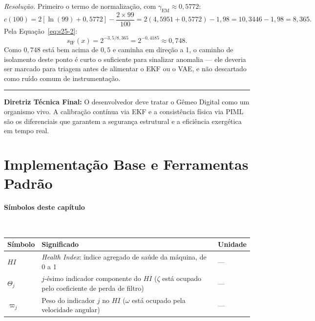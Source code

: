 \documentclass[12pt,a4paper]{article}
\numberwithin{equation}{section}
\numberwithin{table}{section}
\numberwithin{figure}{section}
\begin{document}
{	\emph{Resolução.} Primeiro o termo de normalização, com
	$\gamma_{\text{EM}} \approx 0{,}5772$:
	$$c(100) = 2\left[\ln(99) + 0{,}5772\right] - \frac{2 \times 99}{100}
	= 2(4{,}5951+0{,}5772) - 1{,}98 = 10{,}3446 - 1{,}98 = 8{,}365.$$
	Pela Equação~\eqref{eq:s25-2}:
	$$s_{\text{IF}}(x) = 2^{-3{,}5/8{,}365} = 2^{-0{,}4185} \approx
	0{,}748.$$
	Como $0{,}748$ está bem acima de $0{,}5$ e caminha em direção a 1,
	o caminho de isolamento deste ponto é curto o suficiente para
	sinalizar anomalia --- ele deveria ser marcado para triagem antes de
	alimentar o EKF ou o VAE, e não descartado como ruído comum de
	instrumentação.

	\vspace{1em}
	\hrule
	\vspace{1em}

	\textbf{Diretriz Técnica Final:} O desenvolvedor deve tratar o Gêmeo Digital como um organismo vivo. A calibração contínua via EKF e a consistência física via PIML são os diferenciais que garantem a segurança estrutural e a eficiência exergética em tempo real.
	
	\newpage

	\clearpage
	\section{Implementação Base e Ferramentas Padrão}

\paragraph{Símbolos deste capítulo}\mbox{}\\[-0.5em]
{\small
\begin{longtable}{>{\raggedright\arraybackslash}p{2.6cm} >{\raggedright\arraybackslash}p{9.2cm} >{\raggedright\arraybackslash}p{2.6cm}}
	\toprule
	\textbf{Símbolo} & \textbf{Significado} & \textbf{Unidade} \\ \midrule
	\endhead
	$HI$ & \textit{Health Index}: índice agregado de saúde da máquina, de 0 a 1 & --- \\
	$\Theta_j$\dag & $j$-ésimo indicador componente do $HI$ ($\zeta$ está ocupado pelo coeficiente de perda de filtro) & --- \\
	$\varpi_j$\dag & Peso do indicador $j$ no $HI$ ($\omega$ está ocupado pela velocidade angular) & --- \\
	\bottomrule
\end{longtable}
}

}
\end{document}
